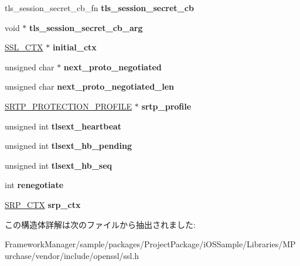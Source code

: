 \begin{DoxyCompactItemize}
\item 
\hypertarget{structssl__st_aff0b13d0e1261db9771d7cf0e64cc5cc}{}tls\+\_\+session\+\_\+secret\+\_\+cb\+\_\+fn {\bfseries tls\+\_\+session\+\_\+secret\+\_\+cb}\label{structssl__st_aff0b13d0e1261db9771d7cf0e64cc5cc}

\item 
\hypertarget{structssl__st_a3e4db63ea16d50062c8b2b062bb648d9}{}void $\ast$ {\bfseries tls\+\_\+session\+\_\+secret\+\_\+cb\+\_\+arg}\label{structssl__st_a3e4db63ea16d50062c8b2b062bb648d9}

\item 
\hypertarget{structssl__st_a704ffea820953b3ca385ce14e6efe570}{}\hyperlink{structssl__ctx__st}{S\+S\+L\+\_\+\+C\+T\+X} $\ast$ {\bfseries initial\+\_\+ctx}\label{structssl__st_a704ffea820953b3ca385ce14e6efe570}

\item 
\hypertarget{structssl__st_aef796f12c3e90c045baad0cd1841e180}{}unsigned char $\ast$ {\bfseries next\+\_\+proto\+\_\+negotiated}\label{structssl__st_aef796f12c3e90c045baad0cd1841e180}

\item 
\hypertarget{structssl__st_aa530fc5efd1d6b0f5f881dbd78b6d3de}{}unsigned char {\bfseries next\+\_\+proto\+\_\+negotiated\+\_\+len}\label{structssl__st_aa530fc5efd1d6b0f5f881dbd78b6d3de}

\item 
\hypertarget{structssl__st_ae8776b7b0b446fb823d9f87176bcfa1d}{}\hyperlink{structsrtp__protection__profile__st}{S\+R\+T\+P\+\_\+\+P\+R\+O\+T\+E\+C\+T\+I\+O\+N\+\_\+\+P\+R\+O\+F\+I\+L\+E} $\ast$ {\bfseries srtp\+\_\+profile}\label{structssl__st_ae8776b7b0b446fb823d9f87176bcfa1d}

\item 
\hypertarget{structssl__st_a8ad372425499d47c2254c89fbcd0deed}{}unsigned int {\bfseries tlsext\+\_\+heartbeat}\label{structssl__st_a8ad372425499d47c2254c89fbcd0deed}

\item 
\hypertarget{structssl__st_a2abf4f35ea6d829b809e2c7c82acdd1f}{}unsigned int {\bfseries tlsext\+\_\+hb\+\_\+pending}\label{structssl__st_a2abf4f35ea6d829b809e2c7c82acdd1f}

\item 
\hypertarget{structssl__st_af5db9aefebe8c45e8f063d2033b1bffd}{}unsigned int {\bfseries tlsext\+\_\+hb\+\_\+seq}\label{structssl__st_af5db9aefebe8c45e8f063d2033b1bffd}

\item 
\hypertarget{structssl__st_a0a493dfdeb51c5c0a73107e0579e9601}{}int {\bfseries renegotiate}\label{structssl__st_a0a493dfdeb51c5c0a73107e0579e9601}

\item 
\hypertarget{structssl__st_aaef9c47543427df406b33888d147f65d}{}\hyperlink{structsrp__ctx__st}{S\+R\+P\+\_\+\+C\+T\+X} {\bfseries srp\+\_\+ctx}\label{structssl__st_aaef9c47543427df406b33888d147f65d}

\end{DoxyCompactItemize}


この構造体詳解は次のファイルから抽出されました\+:\begin{DoxyCompactItemize}
\item 
Framework\+Manager/sample/packages/\+Project\+Package/i\+O\+S\+Sample/\+Libraries/\+M\+Purchase/vendor/include/openssl/ssl.\+h\end{DoxyCompactItemize}
